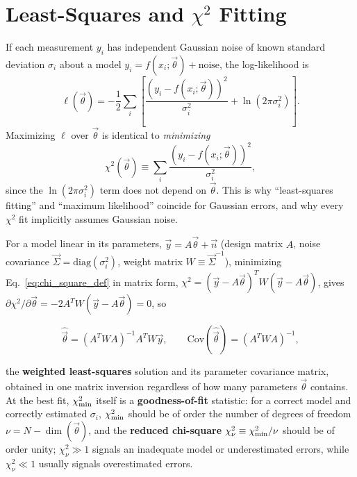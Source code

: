 \section{Least-Squares and \texorpdfstring{$\chi^2$}{Chi-Squared} Fitting}

\begin{result}
	If each measurement $y_i$ has independent Gaussian noise of known standard deviation $\sigma_i$ about a model $y_i=f(x_i;\vec\theta)+\text{noise}$, the log-likelihood is
	\[
	\ell(\vec\theta) = -\frac12\sum_i\left[\frac{(y_i-f(x_i;\vec\theta))^2}{\sigma_i^2}+\ln(2\pi\sigma_i^2)\right].
	\]
	Maximizing $\ell$ over $\vec\theta$ is identical to \emph{minimizing}
	\begin{equation}
		\chi^2(\vec\theta) \equiv \sum_i\frac{(y_i-f(x_i;\vec\theta))^2}{\sigma_i^2},
		\label{eq:chi_square_def}
	\end{equation}
	since the $\ln(2\pi\sigma_i^2)$ term does not depend on $\vec\theta$. This is why ``least-squares fitting'' and ``maximum likelihood'' coincide for Gaussian errors, and why every $\chi^2$ fit implicitly assumes Gaussian noise.
\end{result}

For a model linear in its parameters, $\vec y = A\vec\theta+\vec n$ (design matrix $A$, noise covariance $\vec\Sigma=\mathrm{diag}(\sigma_i^2)$, weight matrix $W\equiv\vec\Sigma^{-1}$), minimizing Eq.~\eqref{eq:chi_square_def} in matrix form, $\chi^2=(\vec y-A\vec\theta)^TW(\vec y-A\vec\theta)$, gives $\partial\chi^2/\partial\vec\theta=-2A^TW(\vec y-A\vec\theta)=0$, so
\begin{keyresult}
	\begin{equation}
		\hat{\vec\theta}=(A^TWA)^{-1}A^TW\vec y, \qquad \mathrm{Cov}(\hat{\vec\theta})=(A^TWA)^{-1},
		\label{eq:weighted_least_squares}
	\end{equation}
\end{keyresult}
the \textbf{weighted least-squares} solution and its parameter covariance matrix, obtained in one matrix inversion regardless of how many parameters $\vec\theta$ contains. At the best fit, $\chi^2_{\rm min}$ itself is a \textbf{goodness-of-fit} statistic: for a correct model and correctly estimated $\sigma_i$, $\chi^2_{\rm min}$ should be of order the number of degrees of freedom $\nu=N-\dim(\vec\theta)$, and the \textbf{reduced chi-square} $\chi^2_\nu\equiv\chi^2_{\rm min}/\nu$ should be of order unity; $\chi^2_\nu\gg1$ signals an inadequate model or underestimated errors, while $\chi^2_\nu\ll1$ usually signals overestimated errors.


